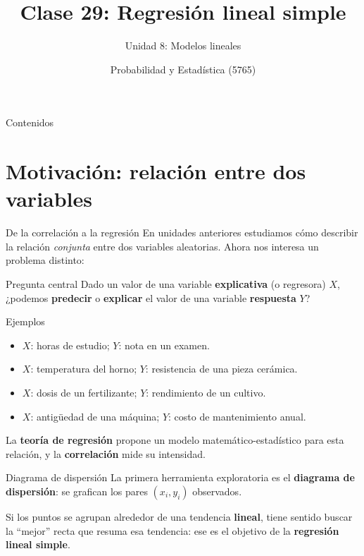\documentclass[aspectratio=169,11pt]{beamer}
\title[Prob. y Estadística]{Clase 29: Regresión lineal simple}
\subtitle{Unidad 8: Modelos lineales}
\institute[UNS]{Universidad Nacional del Sur \\ Departamento de Matemática}
\author{Probabilidad y Estadística (5765)}
\date{}
\begin{document}
\begin{frame}
\titlepage
\end{frame}

\begin{frame}{Contenidos}
\tableofcontents
\end{frame}

\section{Motivación: relación entre dos variables}

\begin{frame}{De la correlación a la regresión}
En unidades anteriores estudiamos cómo describir la relación \emph{conjunta} entre dos variables aleatorias. Ahora nos interesa un problema distinto:

\begin{block}{Pregunta central}
Dado un valor de una variable \textbf{explicativa} (o regresora) $X$, ¿podemos \textbf{predecir} o \textbf{explicar} el valor de una variable \textbf{respuesta} $Y$?
\end{block}

\begin{exampleblock}{Ejemplos}
\begin{itemize}
\item $X$: horas de estudio; $Y$: nota en un examen.
\item $X$: temperatura del horno; $Y$: resistencia de una pieza cerámica.
\item $X$: dosis de un fertilizante; $Y$: rendimiento de un cultivo.
\item $X$: antigüedad de una máquina; $Y$: costo de mantenimiento anual.
\end{itemize}
\end{exampleblock}

La \textbf{teoría de regresión} propone un modelo matemático-estadístico para esta relación, y la \textbf{correlación} mide su intensidad.
\end{frame}

\begin{frame}{Diagrama de dispersión}
La primera herramienta exploratoria es el \textbf{diagrama de dispersión}: se grafican los pares $(x_i,y_i)$ observados.

\begin{center}
\end{center}

Si los puntos se agrupan alrededor de una tendencia \textbf{lineal}, tiene sentido buscar la ``mejor'' recta que resuma esa tendencia: ese es el objetivo de la \textbf{regresión lineal simple}.
\end{frame}
\end{document}
